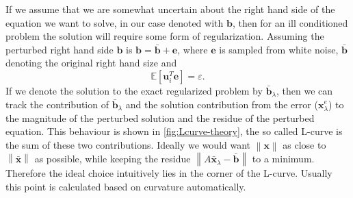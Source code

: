 \documentclass{article}
\begin{document}
	If we assume that we are somewhat uncertain about the right hand side of the equation we want to solve, in our case denoted with $\textbf{b}$, then for an ill conditioned problem the solution will require some form of regularization. Assuming the perturbed right hand side $\textbf{b}$ is ${\textbf{b}} = \bar{\textbf{b}}+ \textbf{e}$, where $\textbf{e}$ is sampled from white noise, $\bar{\textbf{b}}$ denoting the original right hand size and
	\begin{equation}
		\mathbb{E}\left[\textbf{u}_i^T \textbf{e}\right] = \varepsilon.
	\end{equation} 
	If we denote the solution to the exact regularized problem by $\bar{\textbf{b}}_\lambda$, then we can track the contribution of  $\bar{\textbf{b}}_\lambda$ and the solution contribution from the error ($\textbf{x}_\lambda^{e}$) to the magnitude of the perturbed solution and the residue of the perturbed equation. This behaviour is shown in \autoref{fig:Lcurve-theory}, the so called L-curve is the sum of these two contributions. Ideally we would want $\left\| {\textbf{x}} \right\|$ as close to $\left\| \bar{\textbf{x}} \right\|$ as possible, while keeping the residue $\left\|A\bar{\textbf{x}}_\lambda - \bar{\textbf{b}}\right\|$ to a minimum. Therefore the ideal choice intuitively lies in the corner of the L-curve. Usually this point is calculated based on curvature automatically.
\end{document}
